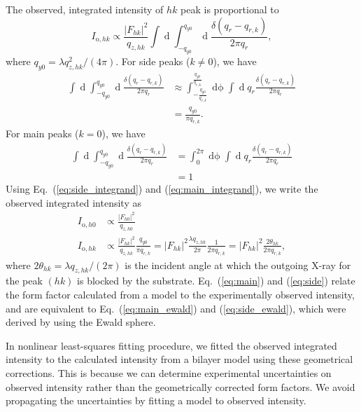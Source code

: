 The observed, integrated intensity of $hk$ peak is proportional to
\begin{equation}
  I_{\mathrm{o},hk} 
    \propto \frac{\lvert F_{hk} \rvert^2}{q_{z,hk}} \int\mathop{dq_x} 
            \int_{-q_{y0}}^{q_{y0}}
            \mathop{dq_y} \frac{\delta(q_r-q_{r,k})}{2\pi q_r},
\end{equation}
where $q_{y0} = \lambda q_{z,hk}^2/(4\pi)$.
For side peaks ($k \neq 0$), we have 
\begin{align}
  \int\mathop{dq_x} \int_{-q_{y0}}^{q_{y0}}\mathop{dq_y} \frac{\delta(q_r-q_{r,k})}{2\pi q_r}
  &\approx \int_{-\frac{q_{y0}}{q_{r,k}}}^{\frac{q_{y0}}{q_{r,k}}} \mathop{d\phi} 
          \int \mathop{dq_r} q_r\frac{\delta(q_r-q_{r,k})}{2\pi q_r} \nonumber\\
 &= \frac{q_{y0}}{\pi q_{r,k}}. \label{eq:side_integrand}
\end{align}
For main peaks ($k=0$), we have 
\begin{align}
  \int\mathop{dq_x} \int_{-q_{y0}}^{q_{y0}}\mathop{dq_y} \frac{\delta(q_r-q_{r,k})}{2\pi q_r}
  &= \int_0^{2\pi}\mathop{d\phi} \int\mathop{dq_r} q_r\frac{\delta(q_r-q_{r,k})}{2\pi q_r} \nonumber\\
  &= 1 \label{eq:main_integrand}
\end{align}
Using Eq.~(\ref{eq:side_integrand}) and (\ref{eq:main_integrand}), 
we write the observed integrated intensity as
\begin{align}
  I_{\mathrm{o},h0} &\propto \frac{|F_{h0}|^2}{q_{z,h0}} \label{eq:main}\\
  I_{\mathrm{o},hk} &\propto \frac{|F_{hk}|^2}{q_{z,hk}} \frac{q_{y0}}{\pi q_{r,k}}
    = |F_{hk}|^2 \frac{\lambda q_{z,hk}}{2\pi}\frac{1}{2\pi q_{r,k}}
    = |F_{hk}|^2 \frac{2\theta_{hk}}{2\pi q_{r,k}}, \label{eq:side}
\end{align}
where $2\theta_{hk} = \lambda q_{z,hk}/(2\pi)$ is the incident angle at which 
the outgoing X-ray for the peak $(hk)$ is blocked by the substrate.
Eq.~(\ref{eq:main}) and (\ref{eq:side}) relate the form factor calculated from
a model to the experimentally observed intensity, and are 
equivalent to Eq.~(\ref{eq:main_ewald}) and (\ref{eq:side_ewald}), 
which were derived by using the Ewald sphere. 

In nonlinear least-squares fitting procedure, 
we fitted the observed integrated intensity to
the calculated intensity from a bilayer model using these geometrical corrections. 
This is because we can determine experimental uncertainties
on observed intensity rather than the geometrically corrected form factors. 
We avoid propagating the uncertainties by fitting a model to observed intensity. 

